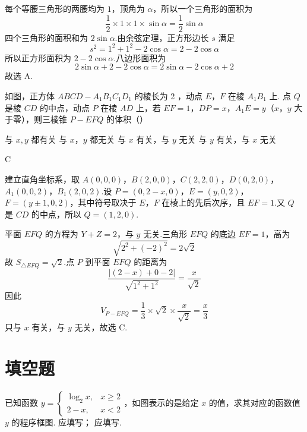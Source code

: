 \begin{solution}
每个等腰三角形的两腰均为 \(1\)，顶角为 \(\alpha\)，所以一个三角形的面积为
\[
\frac{1}{2}\times1\times1\times\sin\alpha=\frac{1}{2}\sin\alpha
\]
四个三角形的面积和为 \(2\sin\alpha\).由余弦定理，正方形边长 \(s\) 满足
\[
s^2=1^2+1^2-2\cos\alpha=2-2\cos\alpha
\]
所以正方形面积为 \(2-2\cos\alpha\).八边形面积为
\[
2\sin\alpha+2-2\cos\alpha=2\sin\alpha-2\cos\alpha+2
\]
故选 A.
\end{solution}

\begin{problem}
如图，正方体 \(ABCD - A_{1}B_{1}C_{1}D_{1}\) 的棱长为 2 ，动点 \(E\)，\(F\) 在棱 \(A_{1}B_{1}\) 上. 点 \(Q\) 是棱 \(CD\) 的中点，动点 \(P\) 在棱 \(AD\) 上，若 \(EF = 1\)，\(DP = x\)，\(A_{1}E = y\)（\(x\)，\(y\) 大于零），则三棱锥 \(P - EFQ\) 的体积（\quad）


\choices
    {与 \(x, y\) 都有关}
    {与 \(x\)，\(y\) 都无关}
    {与 \(x\) 有关，与 \(y\) 无关}
    {与 \(y\) 有关，与 \(x\) 无关}
\end{problem}

\begin{answer}
C
\end{answer}

\begin{solution}
建立直角坐标系，取 \(A(0,0,0)\)，\(B(2,0,0)\)，\(C(2,2,0)\)，\(D(0,2,0)\)，\(A_1(0,0,2)\)，\(B_1(2,0,2)\).设 \(P=(0,2-x,0)\)，\(E=(y,0,2)\)，\(F=(y\pm1,0,2)\)，其中符号取决于 \(E\)，\(F\) 在棱上的先后次序，且 \(EF=1\).又 \(Q\) 是 \(CD\) 的中点，所以 \(Q=(1,2,0)\).

平面 \(EFQ\) 的方程为 \(Y+Z=2\)，与 \(y\) 无关.三角形 \(EFQ\) 的底边 \(EF=1\)，高为
\[
\sqrt{2^2+(-2)^2}=2\sqrt{2}
\]
故 \(S_{\triangle EFQ}=\sqrt{2}\).点 \(P\) 到平面 \(EFQ\) 的距离为
\[
\frac{|(2-x)+0-2|}{\sqrt{1^2+1^2}}=\frac{x}{\sqrt{2}}
\]
因此
\[
V_{P-EFQ}=\frac{1}{3}\times\sqrt{2}\times\frac{x}{\sqrt{2}}=\frac{x}{3}
\]
只与 \(x\) 有关，与 \(y\) 无关，故选 C.
\end{solution}

\section{填空题}

\begin{problem}
已知函数 \( y = \begin{cases}
\log_{2} x, & x \geqslant 2\\
2 - x, & x < 2
\end{cases} \)，如图表示的是给定 \(x\) 的值，求其对应的函数值 \(y\) 的程序框图.  应填写\fillinblank{}； 应填写\fillinblank{}.

\end{problem}

